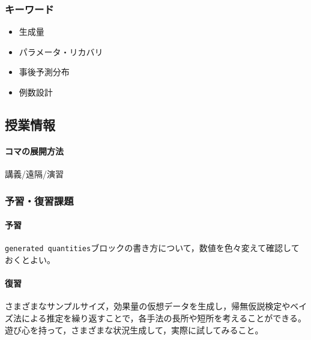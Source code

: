 \subsubsection{キーワード}
\begin{itemize}
    \item 生成量
    \item パラメータ・リカバリ
    \item 事後予測分布
    \item 例数設計
\end{itemize}
\subsection{授業情報}
\paragraph{コマの展開方法}
講義/遠隔/演習
\subsubsection{予習・復習課題}
\paragraph{予習}\verb|generated quantities|ブロックの書き方について，数値を色々変えて確認しておくとよい。
\paragraph{復習}さまざまなサンプルサイズ，効果量の仮想データを生成し，帰無仮説検定やベイズ法による推定を繰り返すことで，各手法の長所や短所を考えることができる。遊び心を持って，さまざまな状況生成して，実際に試してみること。